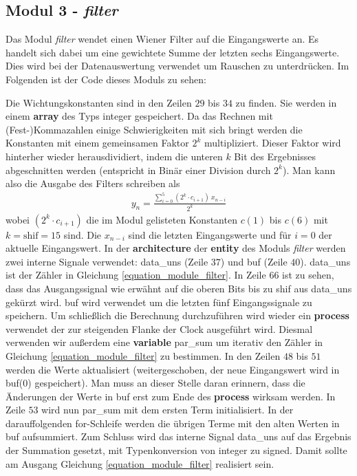 \subsection{Modul 3 - \textit{filter}}

Das Modul \textit{filter} wendet einen Wiener Filter auf die Eingangswerte an.
Es handelt sich dabei um eine gewichtete Summe der letzten sechs Eingangswerte.
Dies wird bei der Datenauswertung verwendet um Rauschen zu unterdrücken.
Im Folgenden ist der Code dieses Moduls zu sehen:



Die Wichtungskonstanten sind in den Zeilen $29$ bis $34$ zu finden.
Sie werden in einem \textbf{array} des Typs integer gespeichert.
Da das Rechnen mit (Fest-)Kommazahlen einige Schwierigkeiten mit sich bringt werden die Konstanten mit einem gemeinsamen Faktor $2^{k}$ multipliziert.
Dieser Faktor wird hinterher wieder herausdividiert, indem die unteren $k$ Bit des Ergebnisses abgeschnitten werden (entspricht in Binär einer Division durch $2^{k}$).
Man kann also die Ausgabe des Filters schreiben als
\begin{gather}
    y_{n} = \frac{\sum_{i=0}^{5} (2^{k} \cdot c_{i+1}) \ x_{n-i}}{2^{k}}
    \label{equation_module_filter}
\end{gather}
wobei $(2^{k} \cdot c_{i+1})$ die im Modul gelisteten Konstanten $c(1)$ bis $c(6)$ mit $k = \text{shif} = 15$ sind.
Die $x_{n-i}$ sind die letzten Eingangswerte und für $i=0$ der aktuelle Eingangswert.
In der \textbf{architecture} der \textbf{entity} des Moduls \textit{filter} werden zwei interne Signale verwendet: data\_uns (Zeile $37$) und buf (Zeile $40$).
data\_uns ist der Zähler in Gleichung \ref{equation_module_filter}.
In Zeile $66$ ist zu sehen, dass das Ausgangssignal wie erwähnt auf die oberen Bits bis zu shif aus data\_uns gekürzt wird.
buf wird verwendet um die letzten fünf Eingangssignale zu speichern.
Um schließlich die Berechnung durchzuführen wird wieder ein \textbf{process} verwendet der zur steigenden Flanke der Clock ausgeführt wird.
Diesmal verwenden wir außerdem eine \textbf{variable} par\_sum um iterativ den Zähler in Gleichung \ref{equation_module_filter} zu bestimmen.
In den Zeilen $48$ bis $51$ werden die Werte aktualisiert (weitergeschoben, der neue Eingangswert wird in buf(0) gespeichert).
Man muss an dieser Stelle daran erinnern, dass die Änderungen der Werte in buf erst zum Ende des \textbf{process} wirksam werden.
In Zeile $53$ wird nun par\_sum mit dem ersten Term initialisiert.
In der darauffolgenden for-Schleife werden die übrigen Terme mit den alten Werten in buf aufsummiert.
Zum Schluss wird das interne Signal data\_uns auf das Ergebnis der Summation gesetzt, mit Typenkonversion von integer zu signed.
Damit sollte am Ausgang Gleichung \ref{equation_module_filter} realisiert sein.

